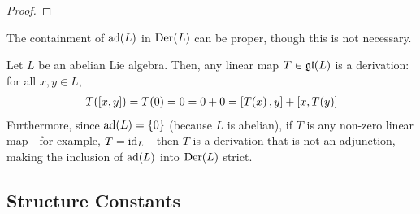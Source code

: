 \begin{proof}
\begin{comment}
        &+ \brac{D\of{\pad{\ell}\of{x}} - \pad{\ell}\of{D\of{x}}, y} \nonumber \\
        =& \brac{x, D\of{\brac{\ell, y}}} - \brac{x, \brac{\ell, D\of{y}}} \nonumber \\
        &+ \brac{D\of{\brac{\ell, x}}, y} - \brac{\brac{\ell, D\of{x}}, y} \nonumber \\
        =& \brac{x, \brac{\ell, D(y)}} + \brac{x, \brac{D\of{\ell}, y}} - \brac{x, \brac{\ell, D\of{y}}} \nonumber \\
        &+ \brac{\brac{\ell, D(x)}, y} + \brac{\brac{D\of{\ell}, x}, y} - \brac{\brac{\ell, D\of{x}}, y} \nonumber \\
        =& \brac{x, \brac{D\of{\ell}, y}} + \brac{\brac{D\of{\ell}, x}, y} \nonumber \\
        =& -\brac{x, \brac{y, D\of{\ell}}} - \brac{y, \brac{D\of{\ell}, x}} \label{Ch1:Eq:ad_ideal_der_RHS}
    \end{align}
    where the last equality follows from antisymmetry \eqref{SP:Eq:LieBracAntisymm}. The Jacobi Identity \eqref{SP:eq:JacobiIdentity} then allows us to put \eqref{Ch1:Eq:ad_ideal_der_LHS} and \eqref{Ch1:Eq:ad_ideal_der_RHS} together and conclude that \eqref{Ch1:Eq:ad_ideal_der} holds, as required. Therefore, the commutator of a derivation and an adjoint is indeed a derivation, proving that $\pad{L}$ is indeed an ideal of $\Der{L}$ with respect to the Lie algebra structure it inherits from $\gl{L}$.
    \end{comment}
\end{proof}

The containment of $\operatorname{ad}\!\left( L \right)$ in $\operatorname{Der}\!\left( L \right)$ can be proper, though this is not necessary.

\begin{boxexample}
    Let $L$ be an abelian Lie algebra. Then, any linear map $T \in \mathfrak{gl}\!\left( L \right)$ is a derivation: for all $x, y \in L$,
    \begin{align*}
        T\!\left( \left[ x, y \right] \right) = T\!\left( 0 \right) = 0 = 0 + 0 = \left[ T\!\left( x \right), y \right] + \left[ x, T\!\left( y \right) \right]
    \end{align*}
    Furthermore, since $\operatorname{ad}\!\left( L \right) = \left\{ 0 \right\}$ (because $L$ is abelian), if $T$ is any non-zero linear map---for example, $T = \operatorname{id}_L$---then $T$ is a derivation that is not an adjunction, making the inclusion of $\operatorname{ad}\!\left( L \right)$ into $\operatorname{Der}\!\left( L \right)$ strict.
\end{boxexample}

\subsection{Structure Constants}

